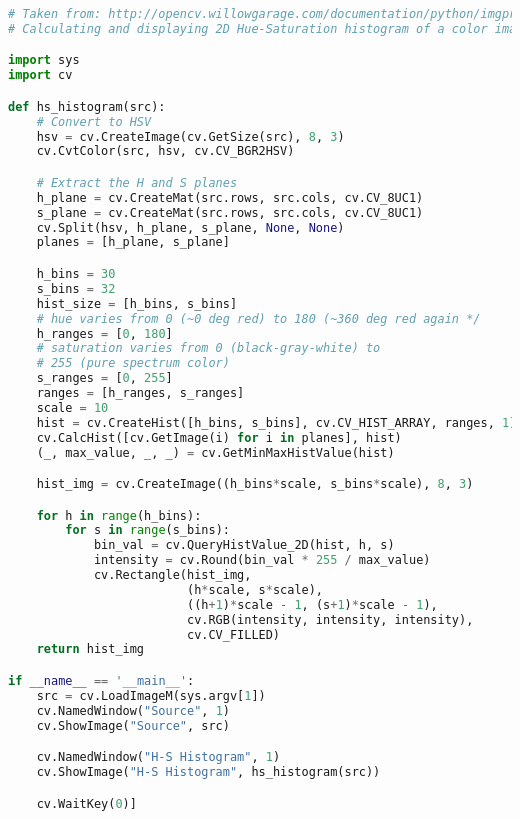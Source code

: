 \begin{lstlisting}[language=python,breaklines=true,label=lst:opencv_histogram,
caption={Example Histogram calculation and displaying code from OpenCV\cite{opencv_library}.}] 
# Taken from: http://opencv.willowgarage.com/documentation/python/imgproc_histograms.html#calchist
# Calculating and displaying 2D Hue-Saturation histogram of a color image

import sys
import cv

def hs_histogram(src):
    # Convert to HSV
    hsv = cv.CreateImage(cv.GetSize(src), 8, 3)
    cv.CvtColor(src, hsv, cv.CV_BGR2HSV)

    # Extract the H and S planes
    h_plane = cv.CreateMat(src.rows, src.cols, cv.CV_8UC1)
    s_plane = cv.CreateMat(src.rows, src.cols, cv.CV_8UC1)
    cv.Split(hsv, h_plane, s_plane, None, None)
    planes = [h_plane, s_plane]

    h_bins = 30
    s_bins = 32
    hist_size = [h_bins, s_bins]
    # hue varies from 0 (~0 deg red) to 180 (~360 deg red again */
    h_ranges = [0, 180]
    # saturation varies from 0 (black-gray-white) to
    # 255 (pure spectrum color)
    s_ranges = [0, 255]
    ranges = [h_ranges, s_ranges]
    scale = 10
    hist = cv.CreateHist([h_bins, s_bins], cv.CV_HIST_ARRAY, ranges, 1)
    cv.CalcHist([cv.GetImage(i) for i in planes], hist)
    (_, max_value, _, _) = cv.GetMinMaxHistValue(hist)

    hist_img = cv.CreateImage((h_bins*scale, s_bins*scale), 8, 3)

    for h in range(h_bins):
        for s in range(s_bins):
            bin_val = cv.QueryHistValue_2D(hist, h, s)
            intensity = cv.Round(bin_val * 255 / max_value)
            cv.Rectangle(hist_img,
                         (h*scale, s*scale),
                         ((h+1)*scale - 1, (s+1)*scale - 1),
                         cv.RGB(intensity, intensity, intensity), 
                         cv.CV_FILLED)
    return hist_img

if __name__ == '__main__':
    src = cv.LoadImageM(sys.argv[1])
    cv.NamedWindow("Source", 1)
    cv.ShowImage("Source", src)

    cv.NamedWindow("H-S Histogram", 1)
    cv.ShowImage("H-S Histogram", hs_histogram(src))

    cv.WaitKey(0)]
\end{lstlisting}


